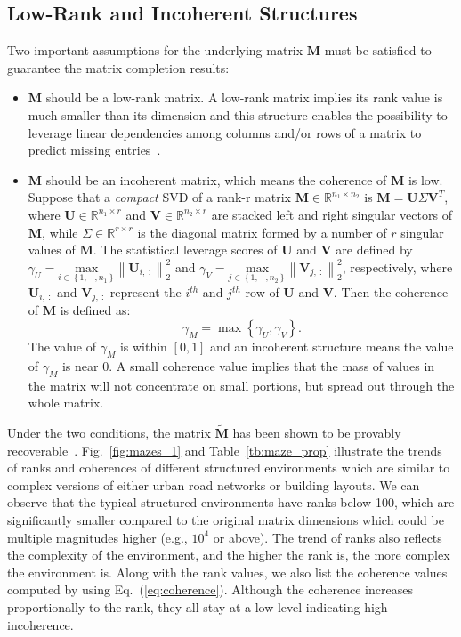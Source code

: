 \subsection{Low-Rank and Incoherent Structures}
Two important assumptions for the underlying matrix $\mathbf{M}$ must be satisfied to guarantee the matrix completion results:
\begin{itemize}
    \item 
    $\mathbf{M}$ should be a low-rank matrix. A low-rank matrix implies its rank value is much smaller than its dimension and this structure enables the possibility to leverage linear dependencies among columns and/or rows of a matrix to predict missing entries~\cite{ongie2018tensor}. 
    \item
    $\mathbf{M}$ should be an incoherent matrix, which means the coherence of $\mathbf{M}$ is low. Suppose that a \textit{compact} SVD of a rank-r matrix $\mathbf{M}\in \mathbb{R}^{n_1\times n_2}$ is $\mathbf{M} = \mathbf{U}\Sigma\mathbf{V}^T$, where $\mathbf{U} \in \mathbb{R}^{n_1\times r}$ and $\mathbf{V}\in \mathbb{R}^{n_2\times r}$ are stacked left and right singular vectors of $\mathbf{M}$, while $\Sigma \in \mathbb{R}^{r\times r}$ is the diagonal matrix formed by a number of $r$ singular values of $\mathbf{M}$. The statistical leverage scores of $\mathbf{U}$ and $\mathbf{V}$ are defined by $\gamma_{U} = \underset{i\in \left \{ 1, \cdots, n_1 \right \}}{\text{max}}\left \| \mathbf{U}_{i,~:} \right \|^2_2$ and $\gamma_{V} = \underset{j\in \left \{ 1, \cdots, n_2 \right \}}{\text{max}}\left \| \mathbf{V}_{j,~ :} \right \|^2_2$, respectively, where $\mathbf{U}_{i,~:}$ and $\mathbf{V}_{j,~:}$ represent the $i^{th}$ and $j^{th}$ row of $\mathbf{U}$ and $\mathbf{V}$. Then the coherence of $\mathbf{M}$ is defined as:
    \begin{equation}
        \label{eq:coherence}
        \gamma_{M} = \max \left \{ \gamma_{U}, \gamma_{V} \right \}.
    \end{equation}
    The value of $\gamma_M$ is within $\left [ 0, 1 \right ]$ and an incoherent structure means the value of $\gamma_M$ is near 0. A small coherence value implies that the mass of values in the matrix will not concentrate on small portions, but spread out through the whole matrix.
\end{itemize}

Under the two conditions, the matrix $\tilde{\mathbf{M}}$ has been shown to be provably recoverable~\cite{candes2009exact}. Fig.~\ref{fig:mazes_1} and Table~\ref{tb:maze_prop} illustrate the trends of ranks and coherences of different structured environments which are similar to complex versions of either urban road networks or building layouts.
We can observe that the typical structured environments have ranks below 100, which are significantly smaller compared to the original matrix dimensions which could be multiple magnitudes higher (e.g., $10^4$ or above). 
The trend of ranks also reflects the complexity of the environment, and the higher the rank is, the more complex the environment is.
Along with the rank values, we also list the coherence values computed by using Eq.~(\ref{eq:coherence}).
Although the coherence increases proportionally to the rank, they all stay at a low level indicating high incoherence. 

